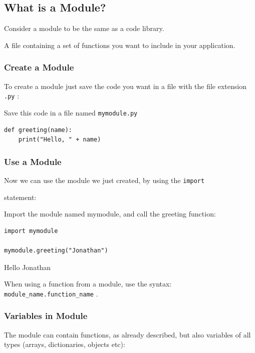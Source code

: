 \documentclass[12pt,a4paper]{article}
\newcommand{\code}[1]{%
	\colorbox{backcolour}{\lstinline{#1}}%
}
\newcommand{\lcode}[1]{%
	\lstinline{#1}%
}
\begin{document}
\subsection{What is a Module?}

Consider a module to be the same as a code library.

A file containing a set of functions you want to include in your
application.

\subsubsection{Create a Module}

To create a module just save the code you want in a file with the file
extension \code{.py}:

\begin{ebox}
Save this code in a file named \lcode{mymodule.py}
	\begin{lstlisting}
def greeting(name):
    print("Hello, " + name)
	\end{lstlisting}
\end{ebox}
\subsubsection{Use a Module}

Now we can use the module we just created, by using the \code{import}
statement:

\begin{ebox}
Import the module named mymodule, and call the greeting function:
	\begin{lstlisting}
import mymodule

mymodule.greeting("Jonathan")
	\end{lstlisting}
\tcblower
	\begin{vercode}
Hello Jonathan
	\end{vercode}
\end{ebox}

\begin{nbox}
When using a function from a module, use the syntax:
\lcode{module_name.function_name}.
\end{nbox}
\subsubsection{Variables in Module}

The module can contain functions, as already described, but also variables
of all types (arrays, dictionaries, objects etc):
\end{document}
